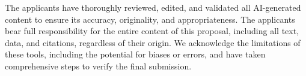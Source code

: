 \documentclass[11pt, a4paper]{article}
\begin{document}
The applicants have thoroughly reviewed, edited, and validated all AI-generated content to ensure its accuracy, originality, and appropriateness. The applicants bear full responsibility for the entire content of this proposal, including all text, data, and citations, regardless of their origin. We acknowledge the limitations of these tools, including the potential for biases or errors, and have taken comprehensive steps to verify the final submission.





\end{document}
